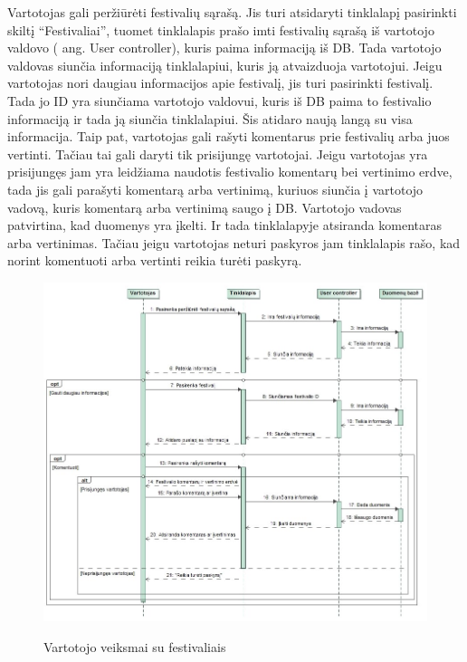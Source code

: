 ﻿\documentclass{VUMIFPSkursinis}
\begin{document}
Vartotojas gali peržiūrėti festivalių sąrašą. Jis turi atsidaryti tinklalapį pasirinkti skiltį “Festivaliai”, tuomet tinklalapis prašo imti festivalių sąrašą iš vartotojo valdovo ( ang. User controller), kuris paima informaciją iš DB. Tada vartotojo valdovas siunčia informaciją tinklalapiui, kuris ją atvaizduoja vartotojui.
Jeigu vartotojas nori daugiau informacijos apie festivalį, jis turi pasirinkti festivalį. Tada jo ID yra siunčiama vartotojo valdovui, kuris iš DB paima to festivalio informaciją ir tada ją siunčia tinklalapiui. Šis atidaro naują langą su visa informacija. Taip pat, vartotojas gali rašyti komentarus  prie festivalių arba juos vertinti. Tačiau tai gali daryti tik prisijungę vartotojai. Jeigu vartotojas yra prisijungęs jam yra leidžiama naudotis festivalio komentarų bei vertinimo erdve, tada jis gali parašyti komentarą arba vertinimą, kuriuos siunčia į vartotojo vadovą, kuris komentarą arba vertinimą saugo į DB. Vartotojo vadovas patvirtina, kad duomenys yra įkelti. Ir tada tinklalapyje atsiranda komentaras arba vertinimas. Tačiau jeigu vartotojas neturi paskyros jam tinklalapis rašo, kad norint komentuoti arba vertinti reikia turėti paskyrą.

\begin{figure}[H]
    \centering
    \includegraphics[scale=0.5]{img/Pav/VartotojoInfoFest_Komentarai}
    \label{img:uml4}
	\caption{Vartotojo veiksmai su festivaliais}
\end{figure}
\end{document}
